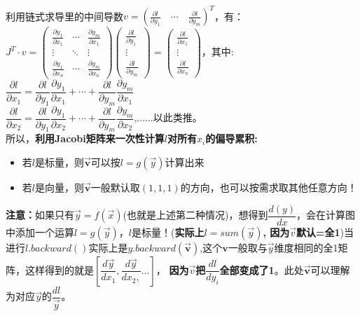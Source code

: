 \documentclass[UTF8]{article}
\begin{document}
    \\
    利用链式求导里的中间导数$v=\left(\frac{\partial l}{\partial y_{1}} \quad \cdots \quad \frac{\partial l}{\partial y_{m}}\right)^{T}$，有：
    \\
    $J^{T} \cdot v=\left(\begin{array}{ccc}{\frac{\partial y_{1}}{\partial x_{1}}} & {\cdots} & {\frac{\partial y_{m}}{\partial x_{1}}} \\ {\vdots} & {\ddots} & {\vdots} \\ {\frac{\partial y_{1}}{\partial x_{n}}} & {\cdots} & {\frac{\partial y_{m}}{\partial x_{n}}}\end{array}\right)\left(\begin{array}{c}{\frac{\partial l}{\partial y_{1}}} \\ {\vdots} \\ {\frac{\partial l}{\partial y_{m}}}\end{array}\right)=\left(\begin{array}{c}{\frac{\partial l}{\partial x_{1}}} \\ {\vdots} \\ {\frac{\partial l}{\partial x_{n}}}\end{array}\right)$，其中:
    \\
    $\dfrac{\partial l}{\partial x_{1}}=\dfrac{\partial l}{\partial y_{1}}\dfrac{\partial y_{1}}{\partial x_{1}} + \cdots + \dfrac{\partial l}{\partial y_{m}}\dfrac{\partial y_{m}}{\partial x_{1}}$
    \\
    $\dfrac{\partial l}{\partial x_{2}}=\dfrac{\partial l}{\partial y_{1}}\dfrac{\partial y_{1}}{\partial x_{2}} + \cdots + \dfrac{\partial l}{\partial y_{m}}\dfrac{\partial y_{m}}{\partial x_{2}}$,......以此类推。
    \\
    所以，\textbf{利用Jacobi矩阵来一次性计算$l$对所有$x_{i}$的偏导累积:}
    \begin{itemize}
        \item  若$l$是标量，则$\bm{\vec{v}}$可以按$l=g(\vec{y})$计算出来
        \item  若$l$是向量，则$\bm{\vec{v}}$一般默认取$(1,1,1)$的方向，也可以按需求取其他任意方向！
    \end{itemize}
    \textbf{注意：}如果只有$\vec{y}=f(\vec{x})$(也就是上述第二种情况)，想得到$\dfrac{d(y)}{dx}$，会在计算图中添加一个运算$l=g(\vec{y})$，$l$是标量！(\textbf{实际上$l=sum(\vec{y})$, 因为$\vec{v}$默认=全1})当进行$l.backward()$实际上是$y.backward(\bm{\vec{v}})$,这个$\bm{v}$一般取与$\vec y$维度相同的全1矩阵，这样得到的就是$[\dfrac{d\vec{y}}{dx_{1}}, \dfrac{d\vec{y}}{dx_{2},} ...]$，
    \textbf{因为$\vec{v}$把$\dfrac{dl}{dy_{i}}$全部变成了1}。此处$\bm{\vec{v}}$可以理解为对应$\vec{y}$的$\dfrac{dl}{\vec{y}}$。
\end{document}
